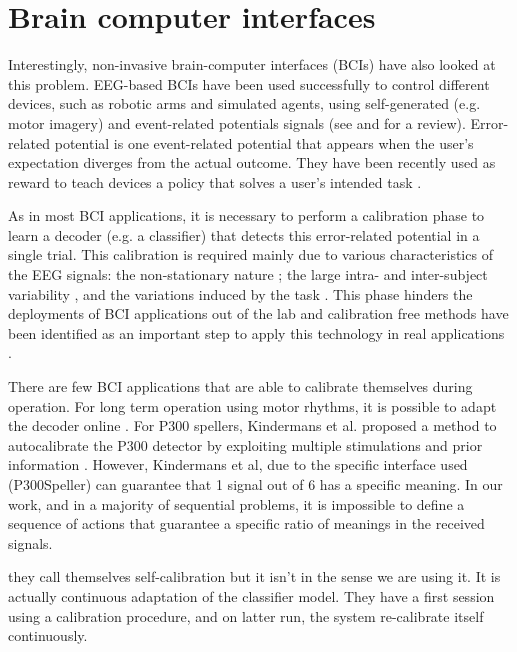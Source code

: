 \section{Brain computer interfaces}

Interestingly, non-invasive brain-computer interfaces (BCIs) have also looked at this problem. EEG-based BCIs have been used successfully to control different devices, such as robotic arms and simulated agents, using self-generated (e.g. motor imagery) and event-related potentials signals (see \cite{chavarriaga2014errare} and \cite{millan10} for a review). 
%
Error-related potential is one event-related potential that appears when the user's expectation diverges from the actual outcome. They have been recently used as reward to teach devices a policy that solves a user's intended task \cite{chavarriaga2010learning,iturrate2010robot}.

As in most BCI applications, it is necessary to perform a calibration phase to learn a decoder (e.g. a classifier) that detects this error-related potential in a single trial. This calibration is required mainly due to various characteristics of the EEG signals: the non-stationary nature \cite{vidaurre11}; the large intra- and inter-subject variability \cite{Polich1997}, and the variations induced by the task \cite{iturrate2013task}. This phase hinders the deployments of BCI applications out of the lab and calibration free methods have been identified as an important step to apply this technology in real applications \cite{millan10}. 

There are few BCI applications that are able to calibrate themselves during operation.  For long term operation using motor rhythms, it is possible to adapt the decoder online \cite{vidaurre2010towards}. For P300 spellers, Kindermans et al. proposed a method to autocalibrate the P300 detector by exploiting multiple stimulations and prior information \cite{Kindermans2012a,Kindermans2012b}. However, Kindermans et al, due to the specific interface used (P300Speller) can guarantee that 1 signal out of 6 has a specific meaning. In our work, and in a majority of sequential problems, it is impossible to define a sequence of actions that guarantee a specific ratio of meanings in the received signals.

\cite{schettini2014self} they call themselves self-calibration but it isn't in the sense we are using it. It is actually continuous adaptation of the classifier model. They have a first session using a calibration procedure, and on latter run, the system re-calibrate itself continuously.

